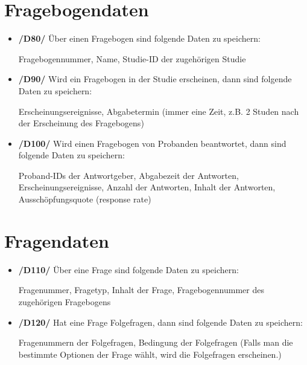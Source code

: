 \documentclass[a4paper]{scrreprt}
\begin{document}
        \section{Fragebogendaten}
            \begin{itemize}
                \item \textbf{/D80/} Über einen Fragebogen sind folgende Daten zu speichern:
                \par Fragebogennummer, Name, Studie-ID der zugehörigen Studie

                \item \textbf{/D90/} Wird ein Fragebogen in der Studie erscheinen, dann sind folgende Daten zu speichern:
                \par Erscheinungsereignisse, Abgabetermin (immer eine Zeit, z.B. 2 Studen nach der Erscheinung des Fragebogens)

                \item \textbf{/D100/} Wird einen Fragebogen von \gls{Proband}en beantwortet, dann sind folgende Daten zu speichern:
                \par \gls{Proband}-IDs der Antwortgeber, Abgabezeit der Antworten, Erscheinungsereignisse, Anzahl der Antworten, Inhalt der Antworten, Ausschöpfungsquote (response rate)
            \end{itemize}

        \section{Fragendaten}
            \begin{itemize}
                \item \textbf{/D110/} Über eine Frage sind folgende Daten zu speichern:
                    \par Fragenummer, Fragetyp, Inhalt der Frage, Fragebogennummer des zugehörigen Fragebogens

                \item \textbf{/D120/} Hat eine Frage Folgefragen, dann sind folgende Daten zu speichern:
                    \par Fragenummern der Folgefragen, Bedingung der Folgefragen (Falls man die bestimmte Optionen der Frage wählt, wird die Folgefragen erscheinen.)
            \end{itemize}
\end{document}
